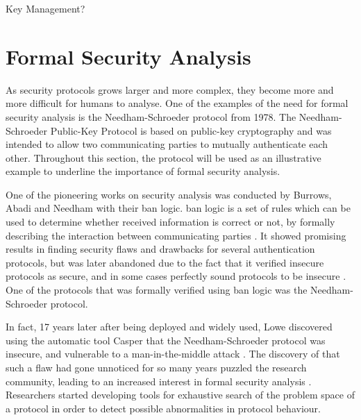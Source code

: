 

Key Management?

\section{Formal Security Analysis} 


As security protocols grows larger and more complex, they become more and more difficult for humans to analyse. One of the examples of the need for formal security analysis is the Needham-Schroeder protocol \cite{Needham:1978} from 1978. The Needham-Schroeder Public-Key Protocol is based on public-key cryptography and was intended to allow two communicating parties to mutually authenticate each other. Throughout this section, the protocol will be used as an illustrative example to underline the importance of formal security analysis.

One of the pioneering works on security analysis was conducted by Burrows, Abadi and Needham with their \gls{ban} logic. \gls{ban} logic is a set of rules which can be used to determine whether received information is correct or not, by formally describing the interaction between communicating parties \cite{burrows1989logic}. It showed promising results in finding security flaws and drawbacks for several authentication protocols, but was later abandoned due to the fact that it verified insecure protocols as secure, and in some cases perfectly sound protocols to be insecure \cite{boyd1993}. One of the protocols that was formally verified using \gls{ban} logic was the Needham-Schroeder protocol.

In fact, 17 years later after being deployed and widely used, Lowe discovered using the automatic tool Casper that the Needham-Schroeder protocol was insecure, and vulnerable to a man-in-the-middle attack \cite{basin2011model} \cite{lowe1996}. The discovery of that such a flaw had gone unnoticed for so many years puzzled the research community, leading to an increased interest in formal security analysis \cite{cremers2009comparing}. Researchers started developing tools for exhaustive search of the problem space of a protocol in order to detect possible abnormalities in protocol behaviour. 



